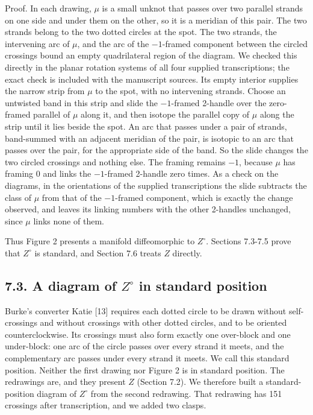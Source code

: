 \documentclass[11pt,letterpaper]{article}
\begin{document}
Proof. In each drawing, $\mu$ is a small unknot that passes over two parallel strands on one side and under them on the other, so it is a meridian of this pair. The two strands belong to the two dotted circles at the spot. The two strands, the intervening arc of $\mu$, and the arc of the $-1$-framed component between the circled crossings bound an empty quadrilateral region of the diagram. We checked this directly in the planar rotation systems of all four supplied transcriptions; the exact check is included with the manuscript sources. Its empty interior supplies the narrow strip from $\mu$ to the spot, with no intervening strands. Choose an untwisted band in this strip and slide the $-1$-framed 2-handle over the zero-framed parallel of $\mu$ along it, and then isotope the parallel copy of $\mu$ along the strip until it lies beside the spot. An arc that passes under a pair of strands, band-summed with an adjacent meridian of the pair, is isotopic to an arc that passes over the pair, for the appropriate side of the band. So the slide changes the two circled crossings and nothing else. The framing remains $-1$, because $\mu$ has framing $0$ and links the $-1$-framed 2-handle zero times. As a check on the diagrams, in the orientations of the supplied transcriptions the slide subtracts the class of $\mu$ from that of the $-1$-framed component, which is exactly the change observed, and leaves its linking numbers with the other 2-handles unchanged, since $\mu$ links none of them.

Thus Figure 2 presents a manifold diffeomorphic to $Z^\circ$. Sections 7.3-7.5 prove that $Z^\circ$ is standard, and Section 7.6 treats $Z$ directly.

\subsection*{7.3. A diagram of $Z^\circ$ in standard position}
Burke's converter Katie [13] requires each dotted circle to be drawn without self-crossings and without crossings with other dotted circles, and to be oriented counterclockwise. Its crossings must also form exactly one over-block and one under-block: one arc of the circle passes over every strand it meets, and the complementary arc passes under every strand it meets. We call this standard position. Neither the first drawing nor Figure 2 is in standard position. The redrawings are, and they present $Z$ (Section 7.2). We therefore built a standard-position diagram of $Z^\circ$ from the second redrawing. That redrawing has 151 crossings after transcription, and we added two clasps.
\end{document}
